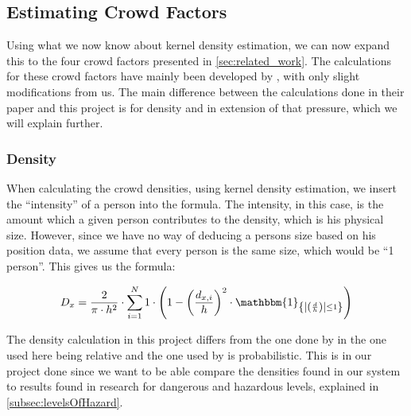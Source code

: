 \subsection{Estimating Crowd Factors}
Using what we now know about kernel density estimation, we can now expand this to the four crowd factors presented in \cref{sec:related_work}. The calculations for these crowd factors have mainly been developed by \citet{wirz2012inferring}, with only slight modifications from us. The main difference between the calculations done in their paper and this project is for density and in extension of that pressure, which we will explain further.

\subsubsection{Density}
When calculating the crowd densities, using kernel density estimation, we insert the \enquote{intensity} of a person into the formula. The intensity, in this case, is the amount which a given person contributes to the density, which is his physical size. However, since we have no way of deducing a persons size based on his position data, we assume that every person is the same size, which would be \enquote{1 person}. This gives us the formula:

\begin{equation}
\label{eq:sumRelativeDensitiesEpanechnikovWithIntensityWeight}
D_x = \frac{2}{\pi \cdot h^2} \cdot \sum_{i=1}^N 1 \cdot \left(1-\left(\frac{d_{x,i}}{h}\right)^2 \cdot \mathbbm{1}_{\left\{\left|\left(\frac{d}{h}\right)\right| \leq 1\right\}}\right)
\end{equation}

The density calculation in this project differs from the one done by \citet{wirz2012inferring} in the one used here being relative and the one used by \citet{wirz2012inferring} is probabilistic. This is in our project done since we want to be able compare the densities found in our system to results found in research for dangerous and hazardous levels, explained in \cref{subsec:levelsOfHazard}.

